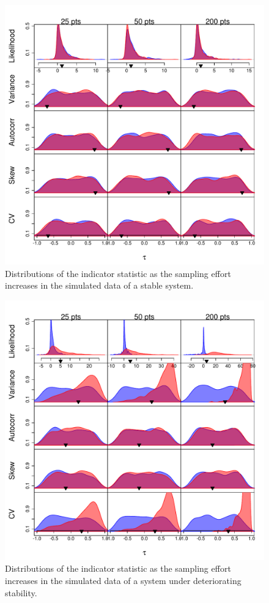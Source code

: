 \documentclass[11pt]{elsarticle}
\begin{document}
\begin{figure}[ht]
  \begin{center}
    \includegraphics{FigS2.pdf}
  \end{center}
  \caption{Distributions of the indicator statistic as the sampling effort increases in the simulated data of a stable system.}
  \label{fig:S2}
\end{figure}

\begin{figure}[ht]
  \begin{center}
    \includegraphics{FigS3.pdf}
  \end{center}
  \caption{Distributions of the indicator statistic as the sampling effort increases in the simulated data of a system under deteriorating stability.}
  \label{fig:S3}
\end{figure}
\end{document}
